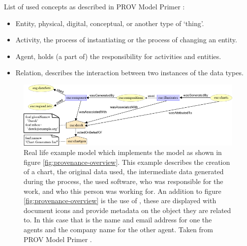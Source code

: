 List of used concepts as described in PROV Model Primer \cite{dsp8gil}:

\begin{itemize}
	\item Entity, physical, digital, conceptual, or another type of `thing'.
	\item Activity, the process of instantiating or the process of changing an entity.
	\item Agent, holds (a part of) the responsibility for activities and entities.
	\item Relation, describes the interaction between two instances of the data types.
\end{itemize}

\begin{figure}[!b]
	\centering
	\includegraphics[width=1.0\linewidth]{images/provenance-large-schema}
	\caption{
		Real life example model which implements the model as shown in figure \ref{fig:provenance-overview}.
		This example describes the creation of a chart, the original data used, the intermediate data generated during the process, the used software, who was responsible for the work, and who this person was working for.
		An addition to figure \ref{fig:provenance-overview} is the use of \attributes{}, these are displayed with document icons and provide metadata on the object they are related to.
		In this case that is the name and email address for one the agents and the company name for the other agent.
		Taken from PROV Model Primer \cite{dsp8gil}.
		}
	\label{fig:provenance-large-schema}
\end{figure}


